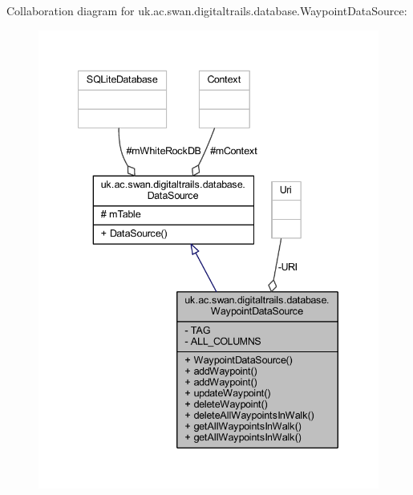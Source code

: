 Collaboration diagram for uk.\+ac.\+swan.\+digitaltrails.\+database.\+Waypoint\+Data\+Source\+:
\nopagebreak
\begin{figure}[H]
\begin{center}
\leavevmode
\includegraphics[width=340pt]{classuk_1_1ac_1_1swan_1_1digitaltrails_1_1database_1_1_waypoint_data_source__coll__graph}
\end{center}
\end{figure}
